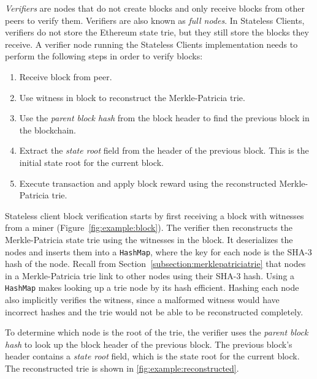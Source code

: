 \documentclass[12pt]{article}
\newcommand{\System}{Stateless Clients\xspace}
\begin{document}
\emph{Verifiers} are nodes that do not create blocks and only receive blocks from other peers to verify them. Verifiers are also known as \emph{full nodes}. In \System, verifiers do not store the Ethereum state trie, but they still store the blocks they receive. A verifier node running the \System implementation needs to perform the following steps in order to verify blocks:

\begin{enumerate}
  \item Receive block from peer.
  \item Use witness in block to reconstruct the Merkle-Patricia trie.
  \item Use the \emph{parent block hash} from the block header to find the previous block in the blockchain.
  \item Extract the \emph{state root} field from the header of the previous block. This is the initial state root for the current block.
  \item Execute transaction and apply block reward using the reconstructed Merkle-Patricia trie.
\end{enumerate}

Stateless client block verification starts by first receiving a block with witnesses from a miner (Figure~\ref{fig:example:block}). The verifier then reconstructs the Merkle-Patricia state trie using the witnesses in the block. It deserializes the nodes and inserts them into a \texttt{HashMap}, where the key for each node is the SHA-3 hash of the node. Recall from Section~\ref{subsection:merklepatriciatrie} that nodes in a Merkle-Patricia trie link to other nodes using their SHA-3 hash. Using a \texttt{HashMap} makes looking up a trie node by its hash efficient. Hashing each node also implicitly verifies the witness, since a malformed witness would have incorrect hashes and the trie would not be able to be reconstructed completely.

To determine which node is the root of the trie, the verifier uses the \emph{parent block hash} to look up the block header of the previous block. The previous block's header contains a \emph{state root} field, which is the state root for the current block. The reconstructed trie is shown in \ref{fig:example:reconstructed}.
\end{document}
